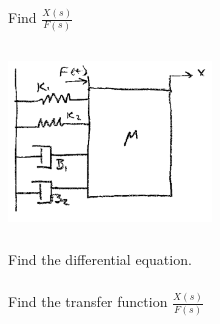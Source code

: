 \documentclass{article}	%
\begin{document}
\subsubsection{} Find $\frac{X(s)}{F(s)}$

%
%
%
%
%
\subsection{}
\includegraphics[width=54mm]{00450a.png}

\subsubsection{} Find the differential equation.

%
%
\subsubsection{}  Find the transfer function $\frac{X(s)}{F(s)}$

%
%
%
%
%
%
%
%
\subsection{}\label{2masstranslation}
\end{document}
